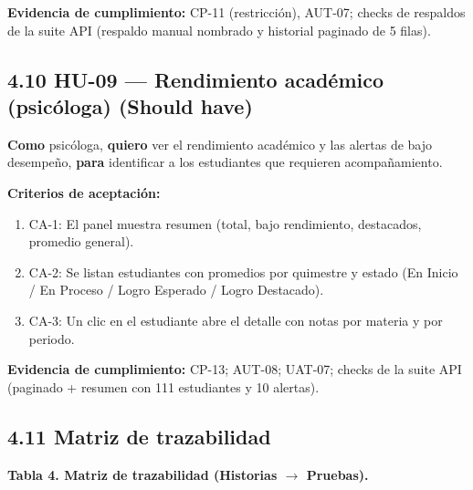 \documentclass[11pt,a4paper]{article}
\begin{document}
\textbf{Evidencia de cumplimiento:} CP-11 (restricción), AUT-07; checks de respaldos de la suite API (respaldo manual nombrado y historial paginado de 5 filas).


\subsection*{4.10 HU-09 --- Rendimiento académico (psicóloga) \textbf{(Should have)}}


\textbf{Como} psicóloga, \textbf{quiero} ver el rendimiento académico y las alertas de bajo desempeño, \textbf{para} identificar a los estudiantes que requieren acompañamiento.


\textbf{Criterios de aceptación:}


\begin{enumerate}[leftmargin=*]
\item CA-1: El panel muestra resumen (total, bajo rendimiento, destacados, promedio general).
\item CA-2: Se listan estudiantes con promedios por quimestre y estado (En Inicio / En Proceso / Logro Esperado / Logro Destacado).
\item CA-3: Un clic en el estudiante abre el detalle con notas por materia y por periodo.
\end{enumerate}


\textbf{Evidencia de cumplimiento:} CP-13; AUT-08; UAT-07; checks de la suite API (paginado + resumen con 111 estudiantes y 10 alertas).


\subsection*{4.11 Matriz de trazabilidad}


\textbf{Tabla 4. Matriz de trazabilidad (Historias {$\rightarrow$} Pruebas).}
\end{document}
